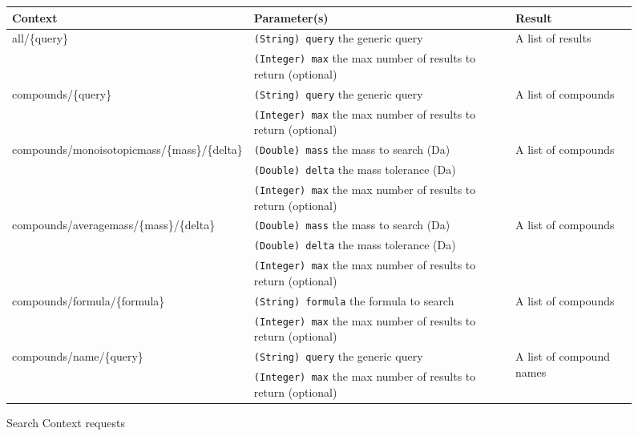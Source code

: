 \begin{figure}[htbp]
	\centering
	\footnotesize{
		\begin{minipage}{16.5 cm}
		\def\arraystretch{1}
		\begin{tabularx}{16cm}{|l|X|p{4cm}|}
			\hline	
			Context & Parameter(s) & Result   \\ 
			\hline
			\hline
			\multirow{2}{*}{all/\{query\}} & \texttt{(String) query} the generic query & \multirow{2}{*}{A list of results}  \\ 
			& \texttt{(Integer) max} the max number of results to return (optional) & \space  \\ 
			\hline
			\multirow{2}{*}{compounds/\{query\}} & \texttt{(String) query} the generic query & \multirow{2}{*}{A list of compounds} \\ 
			& \texttt{(Integer) max} the max number of results to return (optional) & \space  \\ 
			\hline
			\multirow{3}{*}{compounds/monoisotopicmass/\{mass\}/\{delta\}} & \texttt{(Double) mass} the mass to search (Da)  & \multirow{3}{*}{A list of compounds} \\ 
			& \texttt{(Double) delta} the mass tolerance (Da) & \space \\ 
			& \texttt{(Integer) max} the max number of results to return (optional) & \space \\ 
			\hline
			\multirow{3}{*}{compounds/averagemass/\{mass\}/\{delta\}} & \texttt{(Double) mass} the mass to search (Da)  & \multirow{3}{*}{A list of compounds} \\ 
			& \texttt{(Double) delta} the mass tolerance (Da) & \space \\ 
			& \texttt{(Integer) max} the max number of results to return (optional) & \space \\ 
			\hline
			\multirow{2}{*}{compounds/formula/\{formula\}} & \texttt{(String) formula} the formula to search  & \multirow{2}{*}{A list of compounds} \\ 
			& \texttt{(Integer) max} the max number of results to return (optional) & \space \\ 
			\hline	
			\multirow{2}{*}{compounds/name/\{query\}} & \texttt{(String) query} the generic query & \multirow{2}{*}{A list of compound names}  \\ 
			& \texttt{(Integer) max} the max number of results to return (optional) & \space \\ 
			 \hline
		\end{tabularx} 
		\caption{Search Context requests}
		\label{searchContext}
		\end{minipage}
	}%
\end{figure}
